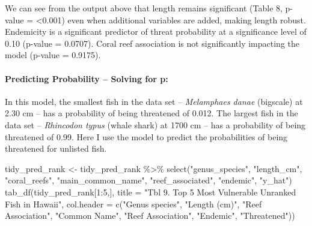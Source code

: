 \documentclass[
  letterpaper,
  DIV=11,
  numbers=noendperiod]{scrartcl}
\let\oldparagraph\paragraph
\renewcommand{\paragraph}[1]{\oldparagraph{#1}\mbox{}}
\newenvironment{Shaded}{\begin{snugshade}}{\end{snugshade}}
\newcommand{\AttributeTok}[1]{\textcolor[rgb]{0.40,0.45,0.13}{#1}}
\newcommand{\DecValTok}[1]{\textcolor[rgb]{0.68,0.00,0.00}{#1}}
\newcommand{\FunctionTok}[1]{\textcolor[rgb]{0.28,0.35,0.67}{#1}}
\newcommand{\NormalTok}[1]{\textcolor[rgb]{0.00,0.23,0.31}{#1}}
\newcommand{\OtherTok}[1]{\textcolor[rgb]{0.00,0.23,0.31}{#1}}
\newcommand{\SpecialCharTok}[1]{\textcolor[rgb]{0.37,0.37,0.37}{#1}}
\newcommand{\StringTok}[1]{\textcolor[rgb]{0.13,0.47,0.30}{#1}}
\begin{document}
We can see from the output above that length remains significant (Table
8, p-value = \textless0.001) even when additional variables are added,
making length robust. Endemicity is a significant predictor of threat
probability at a significance level of 0.10 (p-value = 0.0707). Coral
reef association is not significantly impacting the model (p-value =
0.9175).

\hypertarget{predicting-probability-solving-for-p}{%
\paragraph{Predicting Probability -- Solving for
p:}\label{predicting-probability-solving-for-p}}

In this model, the smallest fish in the data set -- \emph{Melamphaes
danae} (bigscale) at 2.30 cm -- has a probability of being threatened of
0.012. The largest fish in the data set -- \emph{Rhincodon typus} (whale
shark) at 1700 cm -- has a probability of being threatened of 0.99. Here
I use the model to predict the probabilities of being threatened for
unlisted fish.

\begin{Shaded}
\begin{Highlighting}[]
\NormalTok{tidy\_pred\_rank }\OtherTok{\textless{}{-}}\NormalTok{ tidy\_pred\_rank }\SpecialCharTok{\%\textgreater{}\%} 
  \FunctionTok{select}\NormalTok{(}\StringTok{"genus\_species"}\NormalTok{, }\StringTok{"length\_cm"}\NormalTok{, }\StringTok{"coral\_reefs"}\NormalTok{, }\StringTok{"main\_common\_name"}\NormalTok{, }\StringTok{"reef\_associated"}\NormalTok{, }\StringTok{"endemic"}\NormalTok{, }\StringTok{"y\_hat"}\NormalTok{)}
\FunctionTok{tab\_df}\NormalTok{(tidy\_pred\_rank[}\DecValTok{1}\SpecialCharTok{:}\DecValTok{5}\NormalTok{,],}
       \AttributeTok{title =} \StringTok{"Tbl 9. Top 5 Most Vulnerable Unranked Fish in Hawaii"}\NormalTok{,}
       \AttributeTok{col.header =} \FunctionTok{c}\NormalTok{(}\StringTok{"Genus species"}\NormalTok{, }\StringTok{"Length (cm)"}\NormalTok{, }\StringTok{"Reef Association"}\NormalTok{,}
                          \StringTok{"Common Name"}\NormalTok{, }\StringTok{"Reef Association"}\NormalTok{, }\StringTok{"Endemic"}\NormalTok{,}
                          \StringTok{"Threatened"}\NormalTok{))}
\end{Highlighting}
\end{Shaded}
\end{document}
